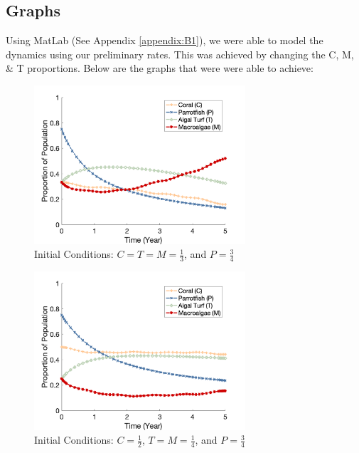 \documentclass[12pt]{article}
\begin{document}
\subsection{Graphs}
Using MatLab (See Appendix \ref{appendix:B1}), we were able to model the dynamics using our preliminary rates. This was achieved by changing the C, M, \& T proportions. Below are the graphs that were were able to achieve:\\
\begin{figure}[H]
    \centering
    \includegraphics[width=0.7\textwidth]{Latex/Figures/Graphs/0.3C_0.3T_0.3M.png}
    \caption{Initial Conditions: $C = T = M = \frac{1}{3}$, and $P = \frac{3}{4}$}
    \label{fig:initial_plot}
\end{figure}
\begin{figure}[H]
    \centering
    \includegraphics[width=0.7\textwidth]{Latex/Figures/Graphs/0.5C_0.25T_0.25M.png}
    \caption{Initial Conditions: $C = \frac{1}{2}$, $T = M = \frac{1}{4}$, and $P = \frac{3}{4}$}
    \label{fig:coral_dominant}
\end{figure}
\end{document}
